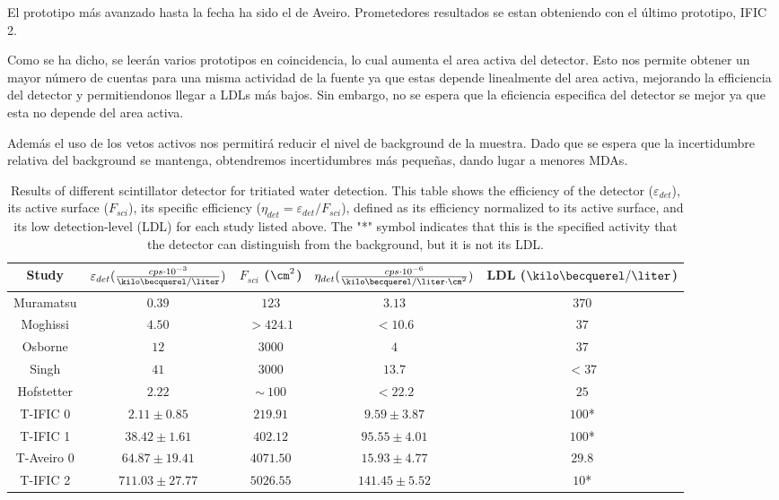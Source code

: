 El prototipo más avanzado hasta la fecha ha sido el de Aveiro. Prometedores resultados se estan obteniendo con el último prototipo, IFIC 2.

Como se ha dicho, se leerán varios prototipos en coincidencia, lo cual aumenta el area activa del detector. Esto nos permite obtener un mayor número de cuentas para una misma actividad de la fuente ya que estas depende linealmente del area activa, mejorando la efficiencia del detector y permitiendonos llegar a LDLs más bajos. Sin embargo, no se espera que la eficiencia especifica del detector se mejor ya que esta no depende del area activa.

Además el uso de los vetos activos nos permitirá reducir el nivel de background de la muestra. Dado que se espera que la incertidumbre relativa del background se mantenga, obtendremos incertidumbres más pequeñas, dando lugar a menores MDAs.

\begin{table}[htbp]
\begin{center}
\begin{tabular}{|c|c|c|c|c|}
\hline
Study & \parbox{5.5em}{\centering $\varepsilon_{det}(\frac{cps \cdot{} 10^{-3}}{\kilo\becquerel/\liter})$}  & \parbox{4.5em}{\centering $F_{sci}$ ($\cm^2$)}  & \parbox{6.5em}{\centering $\eta_{det}(\frac{cps \cdot{} 10^{-6}}{\kilo\becquerel/ \liter \cdot{} \cm^2})$} & LDL ($\kilo\becquerel / \liter$)\\
\hline \hline \hline
Muramatsu & $0.39$ & $123$ & $3.13$ & $370$ \\ \hline
Moghissi & $4.50$ & $>424.1$ & $<10.6$ & $37$ \\\hline
Osborne & $12$ & $3000$ & $4$ & $37$ \\ \hline
Singh & $41$ & $3000$ & $13.7$ & $<37$ \\ \hline
Hofstetter & $2.22$ & $\sim~100$ & $<22.2$ & $25$ \\ \hline
T-IFIC 0 & $2.11 \pm 0.85$ & $219.91$ & $9.59 \pm 3.87$ & $100$* \\ \hline
T-IFIC 1 & $38.42 \pm 1.61$ & $402.12$ & $95.55 \pm 4.01$ & $100$* \\ \hline
T-Aveiro 0 & $64.87 \pm 19.41$ & $4071.50$ & $15.93 \pm 4.77$ & $29.8$ \\ \hline
T-IFIC 2 & $711.03 \pm 27.77$ & $5026.55$ & $141.45 \pm 5.52$ & $10$* \\ \hline
\end{tabular}
\caption{Results of different scintillator detector for tritiated water detection. This table shows the efficiency of the detector ($\varepsilon_{det}$), its active surface ($F_{sci}$), its specific efficiency ($\eta_{det}=\varepsilon_{det}/F_{sci}$), defined as its efficiency normalized to its active surface, and its low detection-level (LDL) for each study listed above. The "*" symbol indicates that this is the specified activity that the detector can distinguish from the background, but it is not its LDL.}
\label{tab:ComparisonResults}
\end{center}
\end{table}